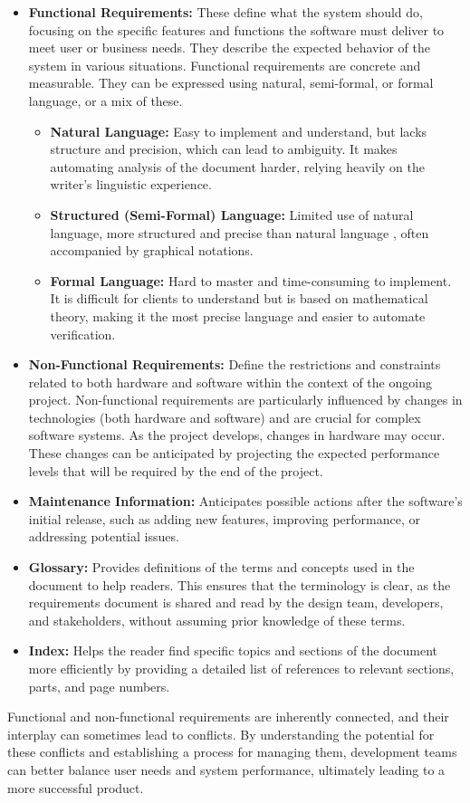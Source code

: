 \begin{itemize}
\item \textbf{Functional Requirements:} These define what the system should do, focusing on the specific features and functions the
software must deliver to meet user or business needs. They describe the expected behavior of the system in various situations.
Functional requirements are concrete and measurable. They can be expressed using natural, semi-formal, or formal language,
or a mix of these. 

\begin{itemize} 
\item \textbf{Natural Language:} Easy to implement and understand, but lacks structure and precision, which can lead to ambiguity.
It makes automating analysis of the document harder, relying heavily on the writer’s linguistic experience. 
\item \textbf{Structured (Semi-Formal) Language:} Limited use of natural language, more structured and precise than natural language
, often accompanied by graphical notations. 
\item \textbf{Formal Language:} Hard to master and time-consuming to implement. It is difficult for clients to understand but is based
on mathematical theory, making it the most precise language and easier to automate verification. 
\end{itemize}

\item \textbf{Non-Functional Requirements:} Define the restrictions and constraints related to both hardware and software within
the context of the ongoing project. Non-functional requirements are particularly influenced by changes in technologies 
(both hardware and software) and are crucial for complex software systems. As the project develops, changes in hardware may occur.
These changes can be anticipated by projecting the expected performance levels that will be required by the end of the project.
\item \textbf{Maintenance Information:} Anticipates possible actions after the software's initial release, such as adding
new features, improving performance, or addressing potential issues.
   \item \textbf{Glossary:} Provides definitions of the terms and concepts used in the document to help readers. This ensures
that the terminology is clear, as the requirements document is shared and read by the design team, developers, and stakeholders, 
without assuming prior knowledge of these terms.
  \item \textbf{Index:} Helps the reader find specific topics and sections of the document more efficiently by providing a
detailed list of references to relevant sections, parts, and page numbers.
\end{itemize}
\begin{tcolorbox}[title = Note]
 Functional and non-functional requirements are inherently connected, and their interplay can sometimes lead to conflicts. 
 By understanding the potential for these conflicts and establishing a process for managing them, development teams can better
 balance user needs and system performance, ultimately leading to a more successful product.
\end{tcolorbox}

